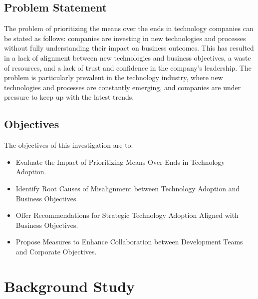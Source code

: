 \documentclass[a4Paper]{article}
\begin{document}
\subsection{Problem Statement}
The problem of prioritizing the means over the ends in technology companies can be stated as follows: companies are investing in new technologies and processes without fully understanding their impact on business outcomes. This has resulted in a lack of alignment between new technologies and business objectives, a waste of resources, and a lack of trust and confidence in the company's leadership. The problem is particularly prevalent in the technology industry, where new technologies and processes are constantly emerging, and companies are under pressure to keep up with the latest trends.

\subsection{Objectives}
The objectives of this investigation are to:
\begin{itemize}
\item Evaluate the Impact of Prioritizing Means Over Ends in Technology Adoption.
\item Identify Root Causes of Misalignment between Technology Adoption and Business Objectives.
\item Offer Recommendations for Strategic Technology Adoption Aligned with Business Objectives.
\item Propose Measures to Enhance Collaboration between Development Teams and Corporate Objectives.
\end{itemize}
\pagebreak

\section{Background Study}

\end{document}
